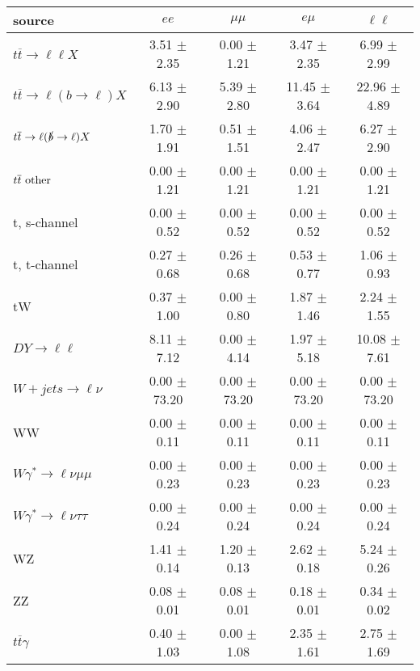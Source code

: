 \begin{tabular}{l|cccc} \hline\hline
source & $ee$ & $\mu\mu$ & $e\mu$ & $\ell\ell $ \\
\hline
$t\overline{t} \rightarrow \ell \ell X$ &  3.51 $\pm$  2.35 &  0.00 $\pm$  1.21 &  3.47 $\pm$  2.35 &  6.99 $\pm$  2.99 \\
$t\overline{t} \rightarrow \ell (b \rightarrow \ell) X$ &  6.13 $\pm$  2.90 &  5.39 $\pm$  2.80 & 11.45 $\pm$  3.64 & 22.96 $\pm$  4.89 \\
$t\overline{t} \rightarrow \ell (\slashed b \rightarrow \ell) X$ &  1.70 $\pm$  1.91 &  0.51 $\pm$  1.51 &  4.06 $\pm$  2.47 &  6.27 $\pm$  2.90 \\
        $t\overline{t}\ \rm{other}$ &  0.00 $\pm$  1.21 &  0.00 $\pm$  1.21 &  0.00 $\pm$  1.21 &  0.00 $\pm$  1.21 \\
\hline
                       t, s-channel &  0.00 $\pm$  0.52 &  0.00 $\pm$  0.52 &  0.00 $\pm$  0.52 &  0.00 $\pm$  0.52 \\
                       t, t-channel &  0.27 $\pm$  0.68 &  0.26 $\pm$  0.68 &  0.53 $\pm$  0.77 &  1.06 $\pm$  0.93 \\
                                 tW &  0.37 $\pm$  1.00 &  0.00 $\pm$  0.80 &  1.87 $\pm$  1.46 &  2.24 $\pm$  1.55 \\
\hline
         $DY \rightarrow \ell \ell$ &  8.11 $\pm$  7.12 &  0.00 $\pm$  4.14 &  1.97 $\pm$  5.18 & 10.08 $\pm$  7.61 \\
      $W+jets \rightarrow \ell \nu$ &  0.00 $\pm$ 73.20 &  0.00 $\pm$ 73.20 &  0.00 $\pm$ 73.20 &  0.00 $\pm$ 73.20 \\
                                 WW &  0.00 $\pm$  0.11 &  0.00 $\pm$  0.11 &  0.00 $\pm$  0.11 &  0.00 $\pm$  0.11 \\
\hline
$W\gamma^{*} \rightarrow \ell \nu \mu\mu$ &  0.00 $\pm$  0.23 &  0.00 $\pm$  0.23 &  0.00 $\pm$  0.23 &  0.00 $\pm$  0.23 \\
$W\gamma^{*} \rightarrow \ell \nu \tau\tau$ &  0.00 $\pm$  0.24 &  0.00 $\pm$  0.24 &  0.00 $\pm$  0.24 &  0.00 $\pm$  0.24 \\
                                 WZ &  1.41 $\pm$  0.14 &  1.20 $\pm$  0.13 &  2.62 $\pm$  0.18 &  5.24 $\pm$  0.26 \\
                                 ZZ &  0.08 $\pm$  0.01 &  0.08 $\pm$  0.01 &  0.18 $\pm$  0.01 &  0.34 $\pm$  0.02 \\
\hline
              $t\overline{t}\gamma$ &  0.40 $\pm$  1.03 &  0.00 $\pm$  1.08 &  2.35 $\pm$  1.61 &  2.75 $\pm$  1.69 \\

\end{tabular}

